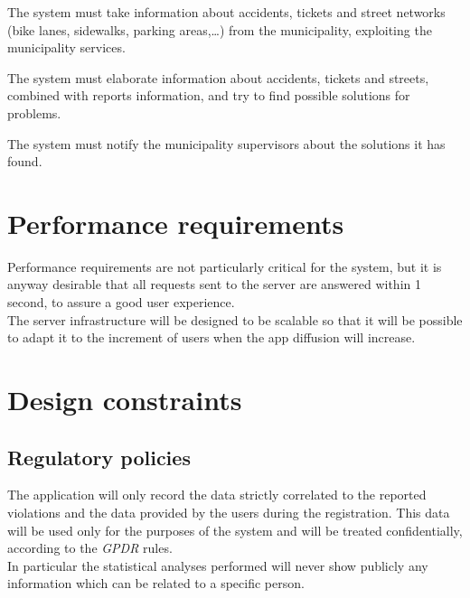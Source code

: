 \documentclass[a4paper]{report}
\begin{document}
\begin{enumerate}[start=1,label={[G\arabic*]}]
\begin{enumerate}[start=40,label={[R\arabic*]}]
\item \label{R40}The system must take information about accidents, tickets and street networks (bike lanes, sidewalks, parking areas,…) from the municipality, exploiting the municipality services.
\item \label{R41}The system must elaborate information about accidents, tickets and streets, combined with reports information, and try to find possible solutions for problems.
\item \label{R42}The system must notify the municipality supervisors about the solutions it has found.
\end{enumerate}
\end{enumerate}


\section{Performance requirements}
Performance requirements are not particularly critical for the system, but it is anyway desirable that all requests sent to the server are answered within 1 second, to assure a good user experience. \\
The server infrastructure will be designed to be scalable so that it will be possible to adapt it to the increment of users when the app diffusion will increase.
\section{Design constraints}
\subsection{Regulatory policies}
The application will only record the data strictly correlated to the reported violations and the data provided by the users during the registration. This data will be used only for the purposes of the system and will be treated confidentially, according to the \textit{GPDR} rules.\\
In particular the statistical analyses performed will never show publicly any information which can be related to a specific person.
\end{document}
